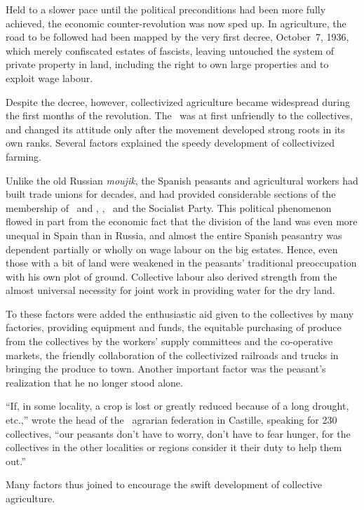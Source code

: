 Held to a slower pace until the political preconditions had been more fully achieved, the economic counter-revolution was now sped up. In agriculture, the road to be followed had been mapped by the very first decree, October~7, 1936, which merely confiscated estates of fascists, leaving untouched the system of private property in land, including the right to own large properties and to exploit wage labour.

Despite the decree, however, collectivized agriculture became widespread during the first months of the revolution. The \UGT\ was at first unfriendly to the collectives, and changed its attitude only after the movement developed strong roots in its own ranks. Several factors explained the speedy development of collectivized farming.

Unlike the old Russian \emph{moujik}, the Spanish peasants and agricultural workers had built trade unions for decades, and had provided considerable sections of the membership of \CNT\ and \FAI, \UGT, \POUM\ and the Socialist Party. This political phenomenon flowed in part from the economic fact that the division of the land was even more unequal in Spain than in Russia, and almost the entire Spanish peasantry was dependent partially or wholly on wage labour on the big estates. Hence, even those with a bit of land were weakened in the peasants’ traditional preoccupation with his own plot of ground. Collective labour also derived strength from the almost universal necessity for joint work in providing water for the dry land.
\nowidow

To these factors were added the enthusiastic aid given to the collectives by many factories, providing equipment and funds, the equitable purchasing of produce from the collectives by the workers’ supply committees and the co-operative markets, the friendly collaboration of the collectivized railroads and trucks in bringing the produce to town. Another important factor was the peasant’s realization that he no longer stood alone.

``If, in some locality, a crop is lost or greatly reduced because of a long drought, etc.,''
wrote the head of the \CNT\ agrarian federation in Castille, speaking for 230 collectives, ``our peasants don’t have to worry, don’t have to fear hunger, for the collectives in the other localities or regions consider it their duty to help them out.''

Many factors thus joined to encourage the swift development of collective agriculture.

